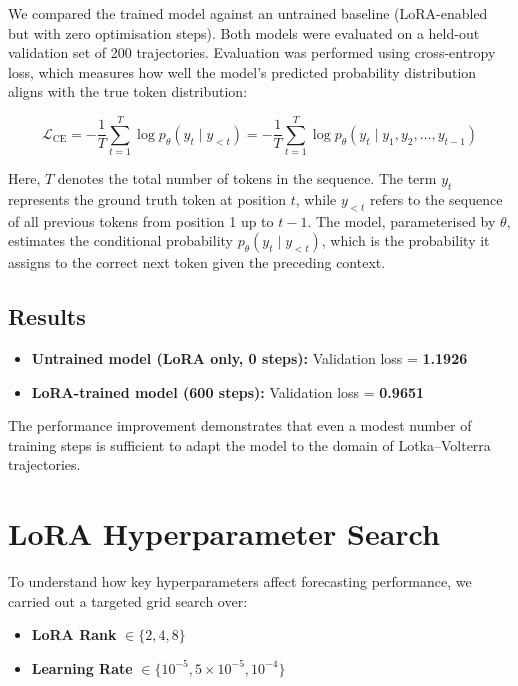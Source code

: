 \documentclass[a4paper,12pt]{article}
\begin{document}
We compared the trained model against an untrained baseline (LoRA-enabled but with zero optimisation steps). Both models were evaluated on a held-out validation set of 200 trajectories.
Evaluation was performed using cross-entropy loss, which measures how well the model's predicted probability distribution aligns with the true token distribution:

\begin{equation}
  \mathcal{L}_{\text{CE}} = - \frac{1}{T} \sum_{t=1}^{T} \log p_\theta(y_t \mid y_{<t}) = - \frac{1}{T} \sum_{t=1}^{T} \log p_\theta(y_t \mid y_1, y_2, \dots, y_{t-1})
\end{equation}

Here, $T$ denotes the total number of tokens in the sequence. The term $y_t$ represents the ground truth token at position $t$, while $y_{<t}$ refers to the sequence of all previous tokens from position 1 up to $t-1$. The model, parameterised by $\theta$, estimates the conditional probability $p_\theta(y_t \mid y_{<t})$, which is the probability it assigns to the correct next token given the preceding context.


\subsection*{Results}

\begin{itemize}
    \item \textbf{Untrained model (LoRA only, 0 steps):} Validation loss = \textbf{1.1926}
    \item \textbf{LoRA-trained model (600 steps):} Validation loss = \textbf{0.9651}
\end{itemize}

The performance improvement demonstrates that even a modest number of training steps is sufficient to adapt the model to the domain of Lotka–Volterra trajectories.

\section{LoRA Hyperparameter Search}

To understand how key hyperparameters affect forecasting performance, we carried out a targeted grid search over:
\begin{itemize}
    \item \textbf{LoRA Rank} $\in \{2, 4, 8\}$
    \item \textbf{Learning Rate} $\in \{10^{-5}, 5 \times 10^{-5}, 10^{-4}\}$
\end{itemize}
\end{document}
